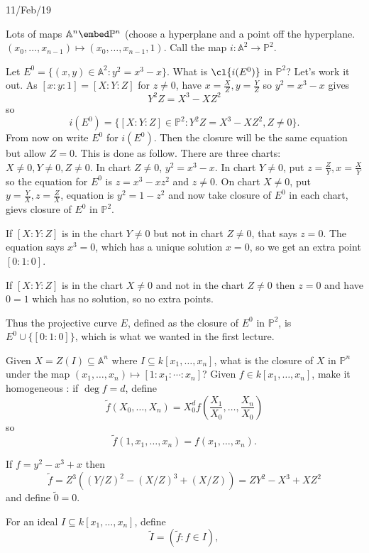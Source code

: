 \documentclass[a4paper]{article}
\renewcommand{\A}{\mathbb{A}}
\renewcommand*{\P}{\mathbb{P}}
\begin{document}
11/Feb/19

Lots of maps \(\A^n \embed \P^n\) (choose a hyperplane and a point off the hyperplane. \((x_0, \dots, x_{n -1}) \mapsto (x_0, \dots, x_{n - 1}, 1)\). Call the map \(i: \A^2 \to \P^2\).

Let \(E^0 = \{(x, y) \in \A^2: y^2 = x^3 - x\}\). What is \(\cl{i(E^0)}\) in \(\P^2\)? Let's work it out. As \([x: y: 1] = [X: Y: Z]\) for \(z \neq 0\), have \(x = \frac{X}{Z}, y = \frac{Y}{Z}\) so \(y^2 = x^3 - x\) gives
\[
  Y^2Z = X^3 - XZ^2
\]
so
\[
  i(E^0) = \{[X: Y: Z] \in \P^2: Y^2Z = X^3 - XZ^2, Z \neq 0\}.
\]
From now on write \(E^0\) for \(i(E^0)\). Then the closure will be the same equation but allow \(Z = 0\). This is done as follow. There are three charts: \(X \neq 0, Y \neq 0, Z \neq 0\). In chart \(Z \neq 0\), \(y^2 = x^3 - x\). In chart \(Y \neq 0\), put \(z = \frac{Z}{Y}, x = \frac{X}{Y}\) so the equation for \(E^0\) is \(z = x^3 - xz^2\) and \(z \neq 0\). On chart \(X \neq 0\), put \(y = \frac{Y}{X}, z = \frac{Z}{X}\), equation is \(y^2 = 1 - z^2\) and now take closure of \(E^0\) in each chart, gievs closure of \(E^0\) in \(\P^2\).

If \([X: Y: Z]\) is in the chart \(Y \neq 0\) but not in chart \(Z \neq 0\), that says \(z = 0\). The equation says \(x^3 = 0\), which has a unique solution \(x = 0\), so we get an extra point \([0: 1: 0]\).

If \([X: Y: Z]\) is  in the chart \(X \neq 0\) and not in the chart \(Z \neq 0\) then \(z = 0\) and have \(0 = 1\) which has no solution, so no extra points.

Thus the projective curve \(E\), defined as the closure of \(E^0\) in \(\P^2\), is \(E^0 \cup \{[0: 1: 0]\}\), which is what we wanted in the first lecture.

Given \(X = Z(I) \subseteq \A^n\) where \(I \subseteq k[x_1, \dots, x_n]\), what is the closure of \(X\) in \(\P^n\) under the map \((x_1, \dots, x_n) \mapsto [1: x_1: \cdots : x_n]\)? Given \(f \in k[x_1, \dots, x_n]\), make it homogeneous : if \(\deg f = d\), define
\[
  \tilde f(X_0, \dots, X_n) = X_0^d f(\frac{X_1}{X_0}, \dots, \frac{X_n}{X_0})
\]
so
\[
  \tilde f(1, x_1, \dots, x_n) = f(x_1, \dots, x_n).
\]

\begin{eg}
  If \(f = y^2 - x^3 + x\) then
  \[
    \tilde f = Z^3((Y/Z)^2 - (X/Z)^3 + (X/Z)) = ZY^2 - X^3 + XZ^2
  \]
  and define \(\tilde 0 = 0\).
\end{eg}

For an ideal \(I \subseteq k[x_1, \dots, x_n]\), define
\[
  \tilde I = (\tilde f: f \in I),
\]
\end{document}
